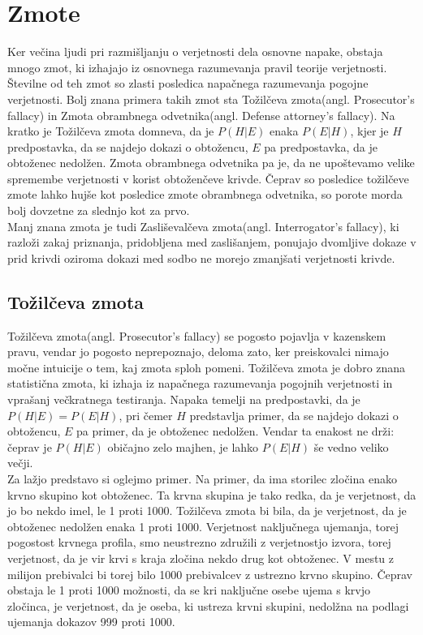 \documentclass[12pt,a4paper]{amsart}
\theoremstyle{definition} %
\theoremstyle{plain} %
\begin{document}
\section{Zmote}
Ker večina ljudi pri razmišljanju o verjetnosti dela osnovne napake, obstaja mnogo zmot, ki izhajajo iz osnovnega razumevanja pravil
teorije verjetnosti. Številne od teh zmot so zlasti posledica napačnega razumevanja pogojne verjetnosti. Bolj znana primera takih zmot sta
Tožilčeva zmota(angl. Prosecutor’s fallacy) in Zmota obrambnega odvetnika(angl. Defense attorney's fallacy).
Na kratko je Tožilčeva zmota domneva, da je $P(H \lvert E)$ enaka $P(E \lvert H)$, kjer je $H$ predpostavka, da se najdejo dokazi o obtožencu,
$E$ pa predpostavka, da je obtoženec nedolžen. Zmota obrambnega odvetnika pa je, da ne upoštevamo velike spremembe verjetnosti v korist
obtoženčeve krivde. Čeprav so posledice tožilčeve zmote lahko hujše kot posledice zmote obrambnega odvetnika, so porote morda bolj
dovzetne za slednjo kot za prvo. \\
 
Manj znana zmota je tudi Zasliševalčeva zmota(angl. Interrogator’s fallacy), ki razloži zakaj priznanja, pridobljena med zaslišanjem, ponujajo
dvomljive dokaze v prid krivdi oziroma dokazi med sodbo ne morejo zmanjšati verjetnosti krivde.

\subsection{Tožilčeva zmota}
Tožilčeva zmota(angl. Prosecutor’s fallacy) se pogosto pojavlja v kazenskem pravu, vendar jo pogosto neprepoznajo, deloma zato, ker preiskovalci 
nimajo močne intuicije o tem, kaj zmota sploh pomeni. Tožilčeva zmota je dobro znana statistična zmota, ki izhaja iz napačnega razumevanja 
pogojnih verjetnosti in vprašanj večkratnega testiranja. Napaka temelji na predpostavki, da je $P(H \lvert E) = P(E \lvert H)$, pri čemer $H$ 
predstavlja primer, da se najdejo dokazi o obtožencu, $E$ pa primer, da je obtoženec nedolžen. Vendar ta enakost ne drži: čeprav je $P(H \lvert E)$ 
običajno zelo majhen, je lahko $P(E \lvert H)$ še vedno veliko večji. \\ 

Za lažjo predstavo si oglejmo primer. Na primer, da ima storilec zločina enako krvno skupino kot obtoženec. Ta krvna skupina je tako redka, da je 
verjetnost, da jo bo nekdo imel, le 1 proti 1000. Tožilčeva zmota bi bila, da je verjetnost, da je obtoženec nedolžen enaka 1 proti 1000. Verjetnost
naključnega ujemanja, torej pogostost krvnega profila, smo neustrezno združili z verjetnostjo izvora, torej verjetnost, da je vir krvi s kraja zločina 
nekdo drug kot obtoženec. V mestu z milijon prebivalci bi torej bilo 1000 prebivalcev z ustrezno krvno skupino. Čeprav obstaja le 1 proti 1000 možnosti, 
da se kri naključne osebe ujema s krvjo zločinca, je verjetnost, da je oseba, ki ustreza krvni skupini, nedolžna na podlagi ujemanja dokazov 999 proti 1000.
\end{document}
